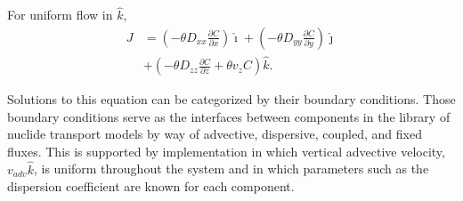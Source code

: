 For uniform flow in $\hat{k}$, 
    \begin{align}
      J &=\left(-\theta D_{xx} \frac{\partial C}{\partial x}
             \right)\hat{\imath}
             + \left( -\theta D_{yy} \frac{\partial C}{\partial y}
            \right)\hat{\jmath}\nonumber\\
            &+ \left( -\theta D_{zz} \frac{\partial C}{\partial z}
             + \theta v_zC \right)\hat{k}.
      \label{unidirflow}
    \end{align}

Solutions to this equation can be categorized by their boundary conditions.  
Those boundary conditions serve as the interfaces between components in the 
\Cyder library of nuclide transport models by way of advective, dispersive, 
coupled, and fixed fluxes.  This is supported by implementation in which 
vertical advective velocity, $v_{adv}\hat{k}$, is uniform throughout the system and in which 
parameters such as the dispersion coefficient are known for each component. 




